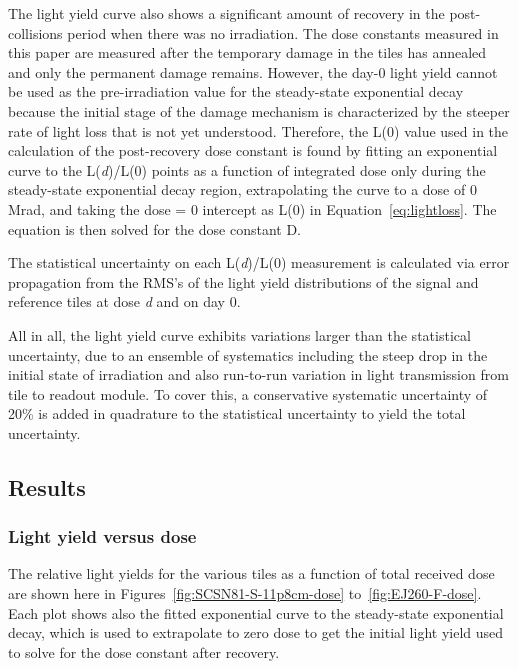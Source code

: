 The light yield curve also shows a significant amount of recovery in the post-collisions period when there was no irradiation. The dose constants measured in this paper are measured after the temporary damage in the tiles has annealed and only the permanent damage remains. However, the day-0 light yield cannot be used as the pre-irradiation value for the steady-state exponential decay because the initial stage of the damage mechanism is characterized by the steeper rate of light loss that is not yet understood. Therefore, the L(0) value used in the calculation of the post-recovery dose constant is found by fitting an exponential curve to the L(\textit{d})/L(0) points as a function of integrated dose only during the steady-state exponential decay region, extrapolating the curve to a dose of 0 Mrad, and taking the dose = 0 intercept as L(0) in Equation~\ref{eq:lightloss}. The equation is then solved for the dose constant D.

The statistical uncertainty on each L(\textit{d})/L(0) measurement is calculated via error propagation from the RMS's of the light yield distributions of the signal and reference tiles at dose \textit{d} and on day 0.

All in all, the light yield curve exhibits variations larger than the statistical uncertainty, due to an ensemble of systematics including the steep drop in the initial state of irradiation and also run-to-run variation in light transmission from tile to readout module. To cover this, a conservative systematic uncertainty of 20\% is added in quadrature to the statistical uncertainty to yield the total uncertainty.

\subsection{Results\label{sec:ana-res}}

\subsubsection{Light yield versus dose\label{sec:ana-res-lyvsdose}}

The relative light yields for the various tiles as a function of total received dose are shown here in Figures~\ref{fig:SCSN81-S-11p8cm-dose} to~\ref{fig:EJ260-F-dose}. Each plot shows also the fitted exponential curve to the steady-state exponential decay, which is used to extrapolate to zero dose to get the initial light yield used to solve for the dose constant after recovery.

